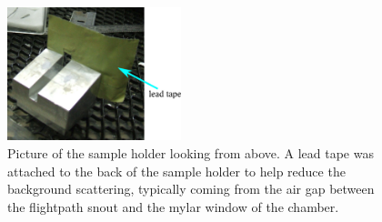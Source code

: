 \begin{figure}[htbp]
  \centering
  \includegraphics[width=0.45\textwidth]{figures/ripple/MMs/transmission/sample_holder1}
  \caption{Picture of the sample holder looking from above. A lead tape was
  attached to the back of the sample holder to help reduce the background 
  scattering, typically coming from the air gap between the flightpath snout
  and the mylar window of the chamber.}
  \label{fig:holder_picture}
\end{figure}

